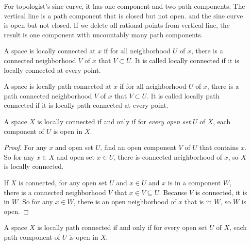 \begin{example}
    For topologist's sine curve, it has one component and two path components. The vertical line is a path component that is closed but not open. and the sine curve is open but not closed. If we delete all rational points from vertical line, the result is one component with uncountably many path components.    
\end{example}



\begin{definition}
    A space is locally connected at $x$ if for all neighborhood $U$ of $x$, there is a connected neighborhood $V$ of $x$ that $V \subset U$. It is called locally connected if it is locally connected at every point.
\end{definition}

\begin{definition}
    A space is locally path connected at $x$ if for all neighborhood $U$ of $x$, there is a path connected neighborhood $V$ of $x$ that $V \subset U$. It is called locally path connected if it is locally path connected at every point.
\end{definition}

\begin{theorem}
A space $X$ is locally connected if and only if for \emph{every open set} $U$ of $X$, each component of $U$ is open in $X$.    
\end{theorem}
\begin{proof}
    For any $x$ and open set $U$, find an open component $V$ of $U$ that contains $x$. So for any $x \in X$ and open set $x \in U$, there is connected neighborhood of $x$, so $X$ is locally connected.
    
    If $X$ is connected, for any open set $U$ and $x \in U$ and $x$ is in a component $W$, there is a connected neighborhood $V$ that $x \in V \subseteq U$. Because $V$ is connected, it is in $W$. So for any $x \in W$, there is an open neighborhood of $x$ that is in $W$, so $W$ is open.
\end{proof}

\begin{theorem}
A space $X$ is locally path connected if and only if for every open set $U$ of $X$, each path component of $U$ is open in $X$.    
\end{theorem}

